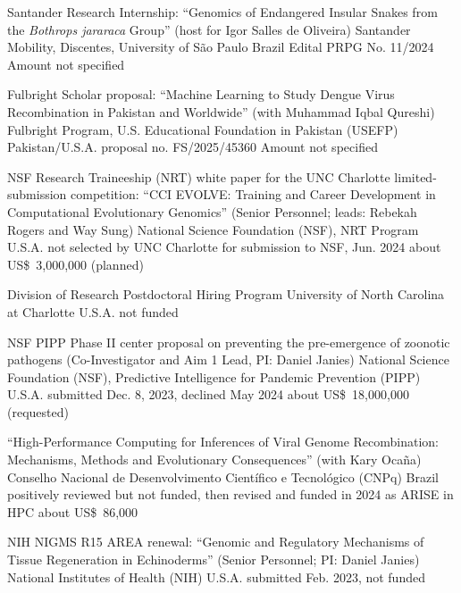 \documentclass[11pt, letterpaper, sans]{moderncv}
\begin{document}
    {Santander Research Internship: ``Genomics of Endangered Insular Snakes from the \textit{Bothrops jararaca} Group'' (host for Igor Salles de Oliveira)}
    {Santander Mobility, Discentes, University of São Paulo}
    {Brazil}
    {Edital PRPG No. 11/2024}
    {Amount not specified}{}

    {Fulbright Scholar proposal: ``Machine Learning to Study Dengue Virus Recombination in Pakistan and Worldwide'' (with Muhammad Iqbal Qureshi)}
    {Fulbright Program, U.S. Educational Foundation in Pakistan (USEFP)}
    {Pakistan/U.S.A.}
    {proposal no. FS/2025/45360}
    {Amount not specified}{}

    {NSF Research Traineeship (NRT) white paper for the UNC Charlotte limited-submission competition: ``CCI EVOLVE: Training and Career Development in Computational Evolutionary Genomics'' (Senior Personnel; leads: Rebekah Rogers and Way Sung)}
    {National Science Foundation (NSF), NRT Program}
    {U.S.A.}
    {not selected by UNC Charlotte for submission to NSF, Jun. 2024}
    {about US\$~3,000,000 (planned)}{}

    {Division of Research Postdoctoral Hiring Program}
    {University of North Carolina at Charlotte}
    {U.S.A.}
    {not funded}
    {}{}

    {NSF PIPP Phase II center proposal on preventing the pre-emergence of zoonotic pathogens (Co-Investigator and Aim 1 Lead, PI: Daniel Janies)}
    {National Science Foundation (NSF), Predictive Intelligence for Pandemic Prevention (PIPP)}
    {U.S.A.}
    {submitted Dec. 8, 2023, declined May 2024}
    {about US\$~18,000,000 (requested)}{}

    {``High-Performance Computing for Inferences of Viral Genome Recombination: Mechanisms, Methods and Evolutionary Consequences'' (with Kary Ocaña)}
    {Conselho Nacional de Desenvolvimento Científico e Tecnológico (CNPq)}
    {Brazil}
    {positively reviewed but not funded, then revised and funded in 2024 as ARISE in HPC}
    {about US\$~86,000}{}

    {NIH NIGMS R15 AREA renewal: ``Genomic and Regulatory Mechanisms of Tissue Regeneration in Echinoderms'' (Senior Personnel; PI: Daniel Janies)}
    {National Institutes of Health (NIH)}
    {U.S.A.}
    {submitted Feb. 2023, not funded}
    {}{}

\end{document}
